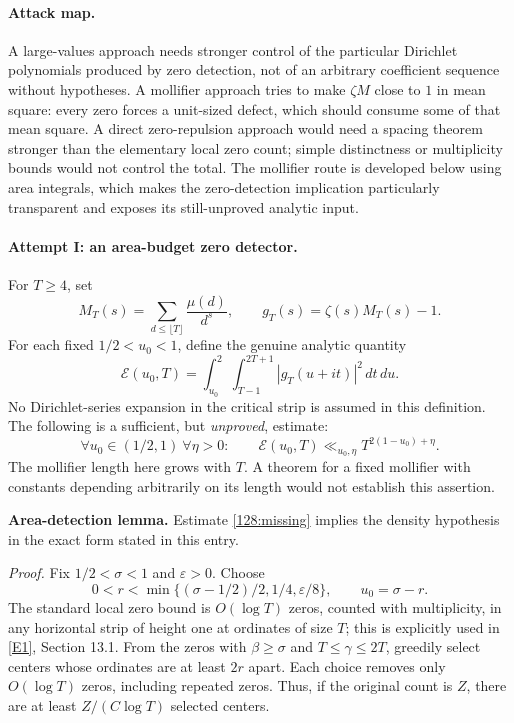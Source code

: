 \documentclass[11pt,a4paper]{article}
\newcommand{\eref}[2]{\hyperlink{extra:#1:#2}{[E#2]}}
\numberwithin{equation}{section}
\begin{document}
\paragraph{Attack map.}
A large-values approach needs stronger control of the particular
Dirichlet polynomials produced by zero detection, not of an arbitrary
coefficient sequence without hypotheses.  A mollifier approach tries
to make $\zeta M$ close to $1$ in mean square: every zero forces a
unit-sized defect, which should consume some of that mean square.
A direct zero-repulsion approach would need a spacing theorem stronger
than the elementary local zero count; simple distinctness or multiplicity
bounds would not control the total.  The mollifier route is developed
below using area integrals, which makes the zero-detection implication
particularly transparent and exposes its still-unproved analytic input.

\paragraph{Attempt I: an area-budget zero detector.}
For $T\geq4$, set
\[
 M_T(s)=\sum_{d\leq\lfloor T\rfloor}\frac{\mu(d)}{d^s},\qquad
 g_T(s)=\zeta(s)M_T(s)-1.
\]
For each fixed $1/2<u_0<1$, define the genuine analytic quantity
\begin{equation}\label{128:area}
 \mathcal E(u_0,T)=\int_{u_0}^{2}\int_{T-1}^{2T+1}
                       |g_T(u+it)|^2\,dt\,du.
\end{equation}
No Dirichlet-series expansion in the critical strip is assumed in this
definition.  The following is a sufficient, but \emph{unproved}, estimate:
\begin{equation}\label{128:missing}
 \forall u_0\in(1/2,1)\ \forall\eta>0:\qquad
 \mathcal E(u_0,T)\ll_{u_0,\eta}T^{2(1-u_0)+\eta}.
\end{equation}
The mollifier length here grows with $T$.  A theorem for a fixed
mollifier with constants depending arbitrarily on its length would not
establish this assertion.

\textbf{Area-detection lemma.}
Estimate \eqref{128:missing} implies the density hypothesis in the exact
form stated in this entry.

\emph{Proof.} Fix $1/2<\sigma<1$ and $\varepsilon>0$.  Choose
\[
 0<r<\min\{(\sigma-1/2)/2,1/4,\varepsilon/8\},\qquad u_0=\sigma-r.
\]
The standard local zero bound is $O(\log T)$ zeros, counted with
multiplicity, in any horizontal strip of height one at ordinates of
size $T$; this is explicitly used in \eref{128}{1}, Section 13.1.
From the zeros with $\beta\geq\sigma$ and $T\leq\gamma\leq2T$,
greedily select centers whose ordinates are at least $2r$ apart.
Each choice removes only $O(\log T)$ zeros, including repeated zeros.
Thus, if the original count is $Z$, there are at least
$Z/(C\log T)$ selected centers.
\end{document}
